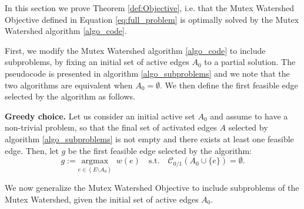 
In this section we prove Theorem \ref{def:Objective}, i.e. that the Mutex Watershed Objective defined in Equation \ref{eq:full_problem} is optimally solved by the Mutex Watershed algorithm \ref{algo_code}. 

First, we modify the Mutex Watershed algorithm \ref{algo_code} to include subproblems, by fixing an initial set of active edges $A_0$ to a partial solution. 
The pseudocode is presented in algorithm \ref{algo_subproblems} and we note that the two algorithms are equivalent when $A_0 = \emptyset$. 
We then define the first feasible edge selected by the algorithm as follows. 

\begin{definition}
\textbf{Greedy choice.}
Let us consider an initial active set $A_0$ and assume to have a non-trivial problem, so that the final set of activated edges $A$ selected by algorithm \ref{algo_subproblems} is not empty and there exists at least one feasible edge. Then, let $g$ be the first feasible edge selected by the algorithm:
\begin{equation}\label{eq:greedy_step}
       g := \underset{e \in (E \setminus A_0)}{\text{argmax}} \;  \; w(e) \quad \mathrm{ s.t. } \quad \mathcal{C}_{0/1}(A_0 \cup \{e\}) = \emptyset. 
\end{equation} 
\end{definition}

We now generalize the Mutex Watershed Objective to include subproblems of the Mutex Watershed, given the initial set of active edges $A_0$.

